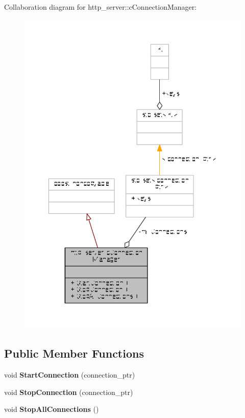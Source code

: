 Collaboration diagram for http\-\_\-server\-:\-:c\-Connection\-Manager\-:
\nopagebreak
\begin{figure}[H]
\begin{center}
\leavevmode
\includegraphics[width=350pt]{classhttp__server_1_1cConnectionManager__coll__graph}
\end{center}
\end{figure}
\subsection*{Public Member Functions}
\begin{DoxyCompactItemize}
\item 
\hypertarget{classhttp__server_1_1cConnectionManager_ab7741005e29b740894addaded7a17ee2}{void {\bfseries Start\-Connection} (connection\-\_\-ptr)}\label{classhttp__server_1_1cConnectionManager_ab7741005e29b740894addaded7a17ee2}

\item 
\hypertarget{classhttp__server_1_1cConnectionManager_a740f1202cf4db1493aac3c8f0a99bbb4}{void {\bfseries Stop\-Connection} (connection\-\_\-ptr)}\label{classhttp__server_1_1cConnectionManager_a740f1202cf4db1493aac3c8f0a99bbb4}

\item 
\hypertarget{classhttp__server_1_1cConnectionManager_a5dddb041d33c7bbb4220deaa9dd74b3c}{void {\bfseries Stop\-All\-Connections} ()}\label{classhttp__server_1_1cConnectionManager_a5dddb041d33c7bbb4220deaa9dd74b3c}

\end{DoxyCompactItemize}
